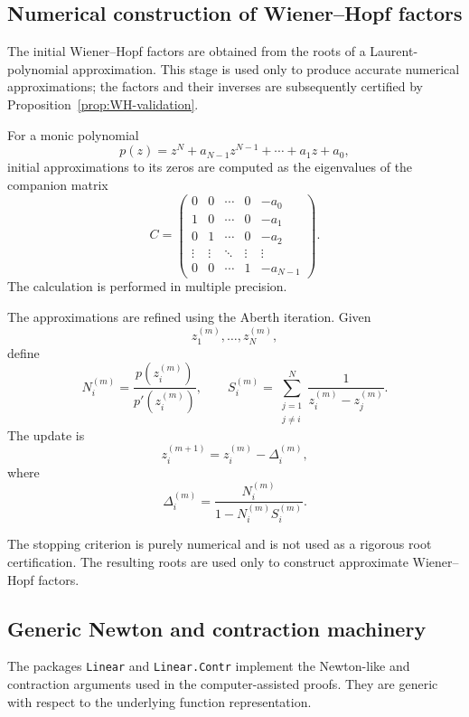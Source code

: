 \documentclass[11pt,a4paper]{amsart}
\begin{document}
\subsection{Numerical construction of Wiener--Hopf factors}
\label{sec:implementation-WH}

The initial Wiener--Hopf factors are obtained from the roots of a
Laurent-polynomial approximation. This stage is used only to produce
accurate numerical approximations; the factors and their inverses are
subsequently certified by
Proposition~\ref{prop:WH-validation}.

For a monic polynomial
\[
p(z)
=
z^N+a_{N-1}z^{N-1}+\cdots+a_1z+a_0,
\]
initial approximations to its zeros are computed as the eigenvalues
of the companion matrix
\[
C=
\begin{pmatrix}
	0 & 0 & \cdots & 0 & -a_0\\
	1 & 0 & \cdots & 0 & -a_1\\
	0 & 1 & \cdots & 0 & -a_2\\
	\vdots & \vdots & \ddots & \vdots & \vdots\\
	0 & 0 & \cdots & 1 & -a_{N-1}
\end{pmatrix}.
\]
The calculation is performed in multiple precision.

The approximations are refined using the Aberth iteration. Given
\[
z_1^{(m)},\ldots,z_N^{(m)},
\]
define
\[
N_i^{(m)}
=
\frac{p(z_i^{(m)})}{p'(z_i^{(m)})},
\qquad
S_i^{(m)}
=
\sum_{\substack{j=1\\j\ne i}}^N
\frac1{z_i^{(m)}-z_j^{(m)}}.
\]
The update is
\[
z_i^{(m+1)}
=
z_i^{(m)}
-
\Delta_i^{(m)},
\]
where
\[
\Delta_i^{(m)}
=
\frac{N_i^{(m)}}
{1-N_i^{(m)}S_i^{(m)}}.
\]

The stopping criterion is purely numerical and is not used as a
rigorous root certification. The resulting roots are used only to
construct approximate Wiener--Hopf factors.

\subsection{Generic Newton and contraction machinery}

The packages {\tt Linear} and {\tt Linear.Contr} implement the
Newton-like and contraction arguments used in the
computer-assisted proofs. They are generic with respect to the
underlying function representation.
\end{document}
